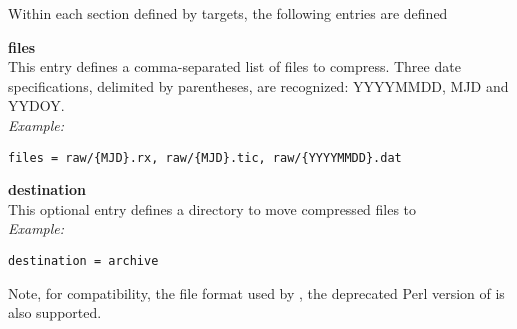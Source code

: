 Within each section defined by targets, the following entries are defined

{\bfseries files}\\
This entry defines a comma-separated list of files to compress. 
Three date specifications, delimited by parentheses, are recognized: YYYYMMDD, MJD and YYDOY.\\
\textit{Example:}
\begin{lstlisting}
files = raw/{MJD}.rx, raw/{MJD}.tic, raw/{YYYYMMDD}.dat
\end{lstlisting}

{\bfseries destination}\\
This optional entry defines a directory to move compressed files to\\
\textit{Example:}
\begin{lstlisting}
destination = archive
\end{lstlisting}

Note, for compatibility, the file format used by  , the deprecated Perl version of  is also supported.
